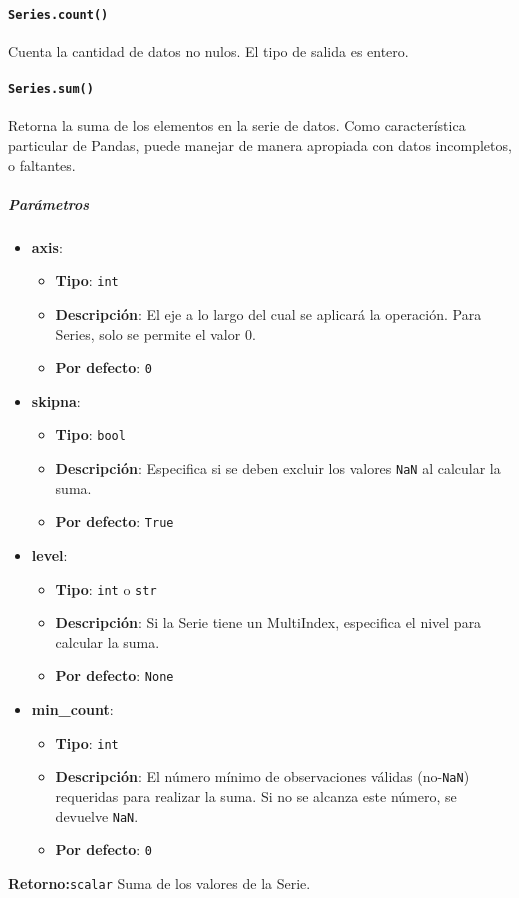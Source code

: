 \paragraph{\texttt{Series.count()}} Cuenta la cantidad de datos no nulos. El tipo de salida es entero.
\paragraph{\texttt{Series.sum()}} Retorna la suma de los elementos en la serie de datos. Como característica particular de Pandas, puede manejar de manera apropiada con datos incompletos, o faltantes. 
\subparagraph{Parámetros}
\begin{itemize}
\item \textbf{axis}: 
\begin{itemize}
\item \textbf{Tipo}: \texttt{int}
\item \textbf{Descripción}: El eje a lo largo del cual se aplicará la operación. Para Series, solo se permite el valor 0.
\item \textbf{Por defecto}: \texttt{0}
\end{itemize}
\item \textbf{skipna}:
\begin{itemize}
\item \textbf{Tipo}: \texttt{bool}
\item \textbf{Descripción}: Especifica si se deben excluir los valores \texttt{NaN} al calcular la suma.
\item \textbf{Por defecto}: \texttt{True}
\end{itemize}
\item \textbf{level}:
\begin{itemize}
\item \textbf{Tipo}: \texttt{int} o \texttt{str}
\item \textbf{Descripción}: Si la Serie tiene un MultiIndex, especifica el nivel para calcular la suma.
\item \textbf{Por defecto}: \texttt{None}
\end{itemize}
\item \textbf{min\_count}:
\begin{itemize}
\item \textbf{Tipo}: \texttt{int}
\item \textbf{Descripción}: El número mínimo de observaciones válidas (no-\texttt{NaN}) requeridas para realizar la suma. Si no se alcanza este número, se devuelve \texttt{NaN}.
\item \textbf{Por defecto}: \texttt{0}
\end{itemize}
\end{itemize}
\textbf{Retorno:}\texttt{scalar} Suma de los valores de la Serie.
